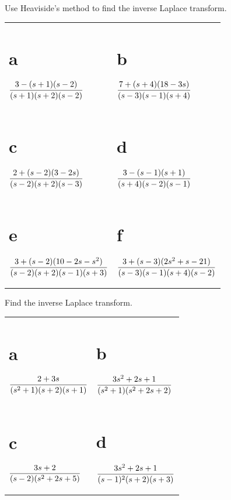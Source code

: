 \begin{exerciselist}
  \item\label{exer:8.2.3} Use Heaviside's method to find the inverse Laplace transform.

  \begin{tabular}[t]{@{}p{168pt}@{}p{168pt}}
    \part{a} $\displaystyle\frac{3-(s+1)(s-2)}{(s+1)(s+2)(s-2)}$              & \part{b} $\displaystyle\frac{7+(s+4)(18-3s)}{(s-3)(s-1)(s+4)}$            \\[10pt]
    \part{c} $\displaystyle\frac{2+(s-2)(3-2s)}{(s-2)(s+2)(s-3)}$             & \part{d} $\displaystyle\frac{3-(s-1)(s+1)}{(s+4)(s-2)(s-1)}$              \\[10pt]
    \part{e} $\displaystyle\frac{3+(s-2)(10-2s-s^{2})}{(s-2)(s+2)(s-1)(s+3)}$ & \part{f} $\displaystyle\frac{3+(s-3)(2s^{2}+s-21)}{(s-3)(s-1)(s+4)(s-2)}$
  \end{tabular}

  \item\label{exer:8.2.4} Find the inverse Laplace transform.

  \begin{tabular}[t]{@{}p{168pt}@{}p{168pt}}
    \part{a} $\displaystyle\frac{2+3s}{(s^{2}+1)(s+2)(s+1)}$      & \part{b} $\displaystyle\frac{3s^{2}+2s+1}{(s^{2}+1)(s^{2}+2s+2)}$ \\[10pt]
    \part{c} $\displaystyle\frac{3s+2}{(s-2)(s^{2}+2s+5)}$        & \part{d} $\displaystyle\frac{3s^{2}+2s+1}{(s-1)^{2}(s+2)(s+3)}$   \\[10pt]

\end{tabular}
\end{exerciselist}
